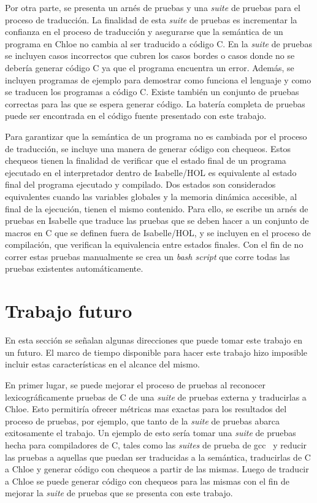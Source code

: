 Por otra parte, se presenta un arnés de pruebas y una \textit{suite} de pruebas para el proceso de traducción.
La finalidad de esta \textit{suite} de pruebas es incrementar la confianza en el proceso de traducción y asegurarse que la semántica de un programa en Chloe no cambia al ser traducido a código C.
En la \textit{suite} de pruebas se incluyen casos incorrectos que cubren los casos bordes o casos donde no se debería generar código C ya que el programa encuentra un error.
Además, se incluyen programas de ejemplo para demostrar como funciona el lenguaje y como se traducen los programas a código C.
Existe también un conjunto de pruebas correctas para las que se espera generar código.
La batería completa de pruebas puede ser encontrada en el código fuente presentado con este trabajo.

Para garantizar que la semántica de un programa no es cambiada por el proceso de traducción, se incluye una manera de generar código con chequeos.
Estos chequeos tienen la finalidad de verificar que el estado final de un programa ejecutado en el interpretador dentro de Isabelle/HOL es equivalente al estado final del programa ejecutado y compilado.
Dos estados son considerados equivalentes cuando las variables globales y la memoria dinámica accesible, al final de la ejecución, tienen el mismo contenido.
Para ello, se escribe un arnés de pruebas en Isabelle que traduce las pruebas que se deben hacer a un conjunto de macros en C que se definen fuera de Isabelle/HOL, y se incluyen en el proceso de compilación, que verifican la equivalencia entre estados finales.
Con el fin de no correr estas pruebas manualmente se crea un \textit{bash script} que corre todas las pruebas existentes automáticamente.

\section{Trabajo futuro}

En esta sección se señalan algunas direcciones que puede tomar este trabajo en un futuro.
El marco de tiempo disponible para hacer este trabajo hizo imposible incluir estas características en el alcance del mismo.

En primer lugar, se puede mejorar el proceso de pruebas al reconocer lexicográficamente pruebas de C de una \textit{suite} de pruebas externa y traducirlas a Chloe.
Esto permitiría ofrecer métricas mas exactas para los resultados del proceso de pruebas, por ejemplo, que tanto de la \textit{suite} de pruebas abarca exitosamente el trabajo.
Un ejemplo de esto sería tomar una \textit{suite} de pruebas hecha para compiladores de C, tales como las \textit{suites} de prueba de gcc~\cite{gcc-tests} y reducir las pruebas a aquellas que puedan ser traducidas a la semántica, traducirlas de C a Chloe y generar código con chequeos a partir de las mismas.
Luego de traducir a Chloe se puede generar código con chequeos para las mismas con el fin de mejorar la \textit{suite} de pruebas que se presenta con este trabajo.

